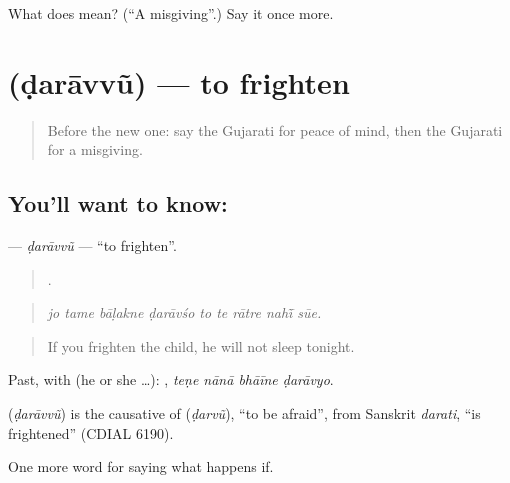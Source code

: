 \begin{tcolorbox}[breakable,colback=teal!4,colframe=teal!35!black,title={Before you move on}]
What does  mean? (\textquotedblleft{}A misgiving\textquotedblright{}.) Say it once more.
\end{tcolorbox}
\section[\texorpdfstring{\gu{ડરાવવું} (ḍarāvvũ)}{ડરાવવું (ḍarāvvũ)}]{ (ḍarāvvũ) — to frighten}

\label{lesson:GU-C369-daravvu}



\begin{quote}
Before the new one: say the Gujarati for peace of mind, then the Gujarati for a misgiving.
\end{quote}

\subsection*{You'll want to know: }
\textbf{} — \emph{ḍarāvvũ} — \textquotedblleft{}to frighten\textquotedblright{}.

\begin{quote}
        .
\end{quote}

\begin{quote}
\emph{jo tame bāḷakne ḍarāvśo to te rātre nahī̃ sūe.}
\end{quote}

\begin{quote}
If you frighten the child, he will not sleep tonight.
\end{quote}

Past, with  (he or she …):    , \emph{teṇe nānā bhāīne ḍarāvyo}.

\begin{cousinweb}
\textbf{} (\emph{ḍarāvvũ}) is the causative of \textbf{} (\emph{ḍarvũ}), \textquotedblleft{}to be afraid\textquotedblright{}, from Sanskrit \emph{darati}, \textquotedblleft{}is frightened\textquotedblright{} (CDIAL 6190).
\end{cousinweb}

\begin{grammarlens}[title={What you've built}]
One more word for saying what happens if.
\end{grammarlens}


